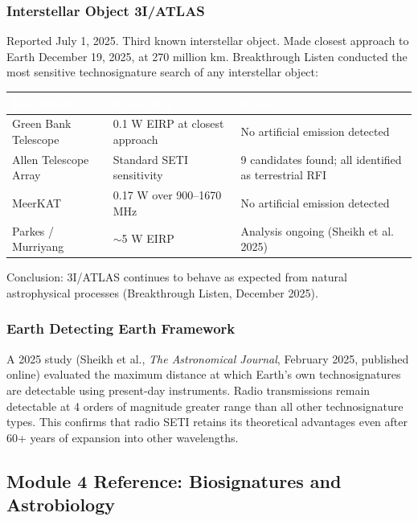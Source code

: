 \documentclass[11pt,letterpaper]{article}
\newcommand{\tableheader}[1]{\textbf{\sffamily\textcolor{white}{#1}}}
\begin{document}
\subsubsection{Interstellar Object 3I/ATLAS}

Reported July 1, 2025. Third known interstellar object. Made closest approach to Earth December 19, 2025, at 270 million km. Breakthrough Listen conducted the most sensitive technosignature search of any interstellar object:

\begin{center}
\begin{tabularx}{\textwidth}{L{3cm}L{3cm}X}
\toprule
{}
\tableheader{Instrument} & \tableheader{Sensitivity} & \tableheader{Result} \\
\midrule
Green Bank Telescope & 0.1 W EIRP at closest approach & No artificial emission detected \\
Allen Telescope Array & Standard SETI sensitivity & 9 candidates found; all identified as terrestrial RFI \\
MeerKAT & 0.17 W over 900--1670 MHz & No artificial emission detected \\
Parkes / Murriyang & $\sim$5 W EIRP & Analysis ongoing (Sheikh et al. 2025) \\
\bottomrule
\end{tabularx}
\end{center}

Conclusion: 3I/ATLAS continues to behave as expected from natural astrophysical processes (Breakthrough Listen, December 2025).

\subsubsection{Earth Detecting Earth Framework}

A 2025 study (Sheikh et al., \textit{The Astronomical Journal}, February 2025, published online) evaluated the maximum distance at which Earth's own technosignatures are detectable using present-day instruments. Radio transmissions remain detectable at 4 orders of magnitude greater range than all other technosignature types. This confirms that radio SETI retains its theoretical advantages even after 60+ years of expansion into other wavelengths.

\subsection{Module 4 Reference: Biosignatures and Astrobiology}
\end{document}
